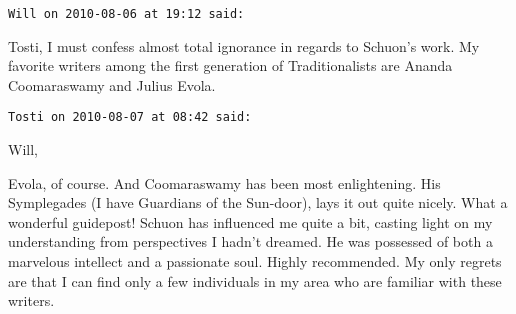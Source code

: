 \begin{footnotesize}
\begin{sffamily}
\hfill

\texttt{Will on 2010-08-06 at 19:12 said: }

Tosti, I must confess almost total ignorance in regards to Schuon's work. My favorite writers among the first generation of Traditionalists are Ananda Coomaraswamy and Julius Evola.


\hfill

\texttt{Tosti on 2010-08-07 at 08:42 said: }

Will,

Evola, of course. And Coomaraswamy has been most enlightening. His Symplegades (I have Guardians of the Sun-door), lays it out quite nicely. What a wonderful guidepost! Schuon has influenced me quite a bit, casting light on my understanding from perspectives I hadn't dreamed. He was possessed of both a marvelous intellect and a passionate soul. Highly recommended. My only regrets are that I can find only a few individuals in my area who are familiar with these writers.


\end{sffamily}\end{footnotesize}
